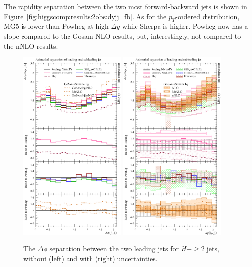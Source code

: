 The rapidity separation between the two most forward-backward jets is
shown in Figure~\ref{fig:higgscomp:results:2obs:dyjj_fb}. As for the
$p_T$-ordered distribution, MG5 is lower than Powheg at high $\Delta
y$ while Sherpa is higher. Powheg now has a slope compared to the
Gosam NLO results, but, interestingly, not compared to the nNLO
results.

\begin{figure}[t!]
  \centering
  \includegraphics[width=0.47\textwidth]{figures/hjetscomp_u_deltaphi_jj_incl.pdf}
  \hfill
  \includegraphics[width=0.47\textwidth]{figures/hjetscomp_deltaphi_jj_incl.pdf}
  \caption{
    The $\Delta\phi$ separation between the two leading jets for
    $H+\ge2$ jets, without (left) and with (right) uncertainties. 
    \label{fig:higgscomp:results:2obs:dphi_jj}
  }
\end{figure}

